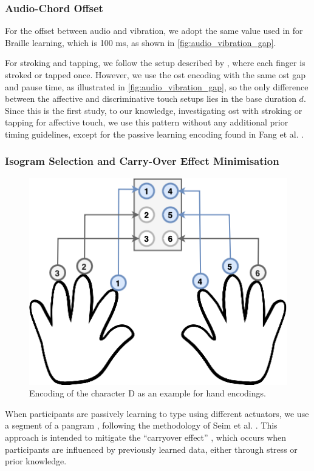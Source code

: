 \subsubsection{Audio-Chord Offset}
For the offset between audio and vibration, we adopt the same value used in \cite{Seim2017} for Braille learning, which is 100 ms, as shown in \autoref{fig:audio_vibration_gap}.

For stroking and tapping, we follow the setup described by \cite{Fang2023}, where each finger is stroked or tapped once. However, we use the \gls{ost} encoding with the same \gls{ost} gap and pause time, as illustrated in \autoref{fig:audio_vibration_gap}, so the only difference between the affective and discriminative touch setups lies in the base duration $d$. Since this is the first study, to our knowledge, investigating \gls{ost} with stroking or tapping for affective touch, we use this pattern without any additional prior timing guidelines, except for the passive learning encoding found in Fang et al. \cite{Fang2023}.

\subsubsection{Isogram Selection and Carry-Over Effect Minimisation}
\begin{figure}
    \centering
    \includegraphics[width=0.5\linewidth]{src/pictures/handBrailleEncoding.drawio.png}
    \caption{Encoding of the character D as an example for hand encodings.}
    \label{fig:hand-encoding}
\end{figure}

When participants are passively learning to type using different actuators, we use a segment of a pangram \cite{Brooke1987}, following the methodology of Seim et al. \cite{Seim2018, Seim2016}. This approach is intended to mitigate the \enquote{carryover effect} \cite{MacFie1989, Brooks2012}, which occurs when participants are influenced by previously learned data, either through stress or prior knowledge.

